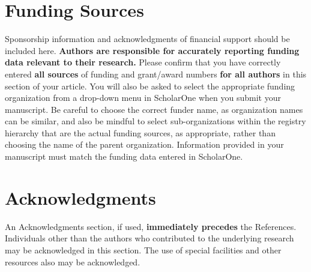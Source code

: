 \documentclass[journal]{new-aiaa}
\begin{document}
\section*{Funding Sources}

Sponsorship information and acknowledgments of financial support should be included here. \textbf{Authors are responsible for accurately reporting funding data relevant to their research.} Please confirm that you have correctly entered \textbf{all sources} of funding and grant/award numbers \textbf{for all authors} in this section of your article. You will also be asked to select the appropriate funding organization from a drop-down menu in ScholarOne when you submit your manuscript. Be careful to choose the correct funder name, as organization names can be similar, and also be mindful to select sub-organizations within the registry hierarchy that are the actual funding sources, as appropriate, rather than choosing the name of the parent organization. Information provided in your manuscript must match the funding data entered in ScholarOne.

\section*{Acknowledgments}
An Acknowledgments section, if used, \textbf{immediately precedes} the References. Individuals other than the authors who contributed to the underlying research may be acknowledged in this section. The use of special facilities and other resources also may be acknowledged. 



\end{document}
